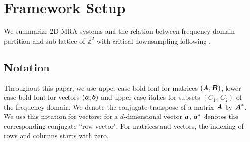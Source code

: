 \section{Framework Setup}\label{sec: setup}
We summarize 2D-MRA systems and the relation between frequency domain partition and sub-lattice of $\mathbb{Z}^2$ with critical downsampling following \cite{yin2014orthshear}.

\subsection{Notation}
Throughout this paper, we use upper case bold font for matrices $(\boldsymbol{A},\boldsymbol{B})$, lower case bold font for vectors $(\boldsymbol{a},\boldsymbol{b})$ and upper case italics for subsets $(C_1,\,C_2)$ of the frequency domain. We denote the conjugate transpose of a matrix $\boldsymbol{A}$ by $\boldsymbol{A}^*$. We use this notation for vectors: for a $d$-dimensional vector $\boldsymbol{a}$, $\boldsymbol{a}^*$ denotes the corresponding conjugate ``row vector". For matrices and vectors, the indexing of rows and columns starts with zero.

